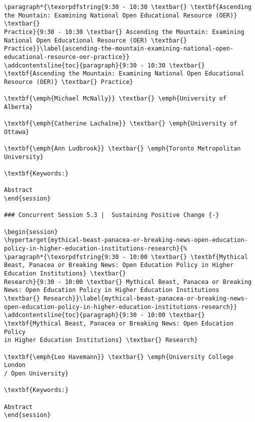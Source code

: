 \documentclass[
]{book}
\begin{document}
\begin{verbatim}
\paragraph*{\texorpdfstring{9:30 - 10:30 \textbar{} \textbf{Ascending
the Mountain: Examining National Open Educational Resource (OER)}
\textbar{}
Practice}{9:30 - 10:30 \textbar{} Ascending the Mountain: Examining National Open Educational Resource (OER) \textbar{} Practice}}\label{ascending-the-mountain-examining-national-open-educational-resource-oer-practice}}
\addcontentsline{toc}{paragraph}{9:30 - 10:30 \textbar{}
\textbf{Ascending the Mountain: Examining National Open Educational
Resource (OER)} \textbar{} Practice}

\textbf{\emph{Michael McNally}} \textbar{} \emph{University of Alberta}

\textbf{\emph{Catherine Lachaîne}} \textbar{} \emph{University of
Ottawa}

\textbf{\emph{Ann Ludbrook}} \textbar{} \emph{Toronto Metropolitan
University}

\textbf{Keywords:}

Abstract
\end{session}

### Concurrent Session 5.3 |  Sustaining Positive Change {-}

\begin{session}
\hypertarget{mythical-beast-panacea-or-breaking-news-open-education-policy-in-higher-education-institutions-research}{%
\paragraph*{\texorpdfstring{9:30 - 10:00 \textbar{} \textbf{Mythical
Beast, Panacea or Breaking News: Open Education Policy in Higher
Education Institutions} \textbar{}
Research}{9:30 - 10:00 \textbar{} Mythical Beast, Panacea or Breaking News: Open Education Policy in Higher Education Institutions \textbar{} Research}}\label{mythical-beast-panacea-or-breaking-news-open-education-policy-in-higher-education-institutions-research}}
\addcontentsline{toc}{paragraph}{9:30 - 10:00 \textbar{}
\textbf{Mythical Beast, Panacea or Breaking News: Open Education Policy
in Higher Education Institutions} \textbar{} Research}

\textbf{\emph{Leo Havemann}} \textbar{} \emph{University College London
/ Open University}

\textbf{Keywords:}

Abstract
\end{session}


\end{verbatim}
\end{document}
